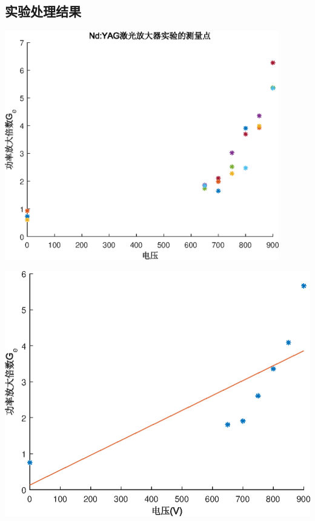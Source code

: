 \documentclass[UTF8]{ctexart}
\makeatletter
\newcommand{\figcaption}{\def\@captype{figure}\caption}
\makeatother
\begin{document}
\subsection{实验处理结果}
\begin{center}
	\includegraphics[height=10cm]{Nd_AllPoints.eps}
	\figcaption{数据点绘制}\label{AllPo}
\end{center}
\begin{center}
	\includegraphics{Nd_AllFitCurve.eps}
	\figcaption{取平均再拟合}\label{fitall}
\end{center}
\end{document}
